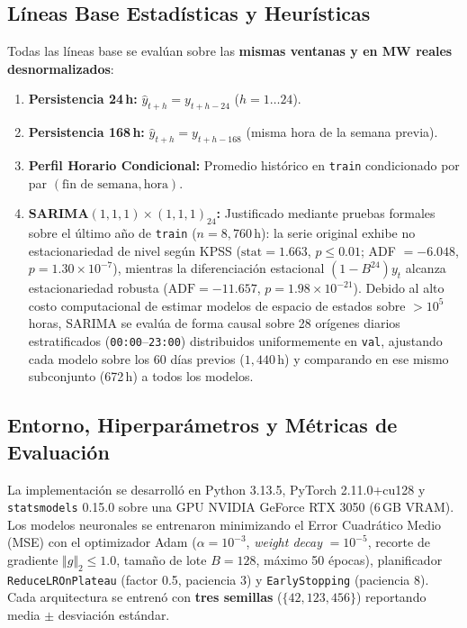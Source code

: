 \documentclass[conference]{IEEEtran}
\begin{document}
\subsection{Líneas Base Estadísticas y Heurísticas}
Todas las líneas base se evalúan sobre las \textbf{mismas ventanas y en MW reales desnormalizados}:
\begin{enumerate}
    \item \textbf{Persistencia 24\,h:} $\hat{y}_{t+h} = y_{t+h-24}$ ($h=1\dots 24$).
    \item \textbf{Persistencia 168\,h:} $\hat{y}_{t+h} = y_{t+h-168}$ (misma hora de la semana previa).
    \item \textbf{Perfil Horario Condicional:} Promedio histórico en \texttt{train} condicionado por par $(\text{fin de semana}, \text{hora})$.
    \item \textbf{SARIMA$(1,1,1)\times(1,1,1)_{24}$:} Justificado mediante pruebas formales sobre el último año de \texttt{train} ($n=8{,}760$\,h): la serie original exhibe no estacionariedad de nivel según KPSS ($\text{stat}=1.663$, $p \le 0.01$; ADF $=-6.048$, $p=1.30\times 10^{-7}$), mientras la diferenciación estacional $(1-B^{24})y_t$ alcanza estacionariedad robusta ($\text{ADF}=-11.657$, $p=1.98\times 10^{-21}$). Debido al alto costo computacional de estimar modelos de espacio de estados sobre $>10^5$ horas, SARIMA se evalúa de forma causal sobre 28 orígenes diarios estratificados (\texttt{00:00}--\texttt{23:00}) distribuidos uniformemente en \texttt{val}, ajustando cada modelo sobre los 60 días previos ($1{,}440$\,h) y comparando en ese mismo subconjunto (672\,h) a todos los modelos.
\end{enumerate}

\subsection{Entorno, Hiperparámetros y Métricas de Evaluación}
La implementación se desarrolló en Python 3.13.5, PyTorch 2.11.0+cu128 y \texttt{statsmodels} 0.15.0 sobre una GPU NVIDIA GeForce RTX 3050 (6\,GB VRAM). Los modelos neuronales se entrenaron minimizando el Error Cuadrático Medio (MSE) con el optimizador Adam ($\alpha=10^{-3}$, \textit{weight decay} $=10^{-5}$, recorte de gradiente $\Vert g \Vert_2 \le 1.0$, tamaño de lote $B=128$, máximo 50 épocas), planificador \texttt{ReduceLROnPlateau} (factor 0.5, paciencia 3) y \texttt{EarlyStopping} (paciencia 8). Cada arquitectura se entrenó con \textbf{tres semillas} ($\{42, 123, 456\}$) reportando media $\pm$ desviación estándar.
\end{document}
